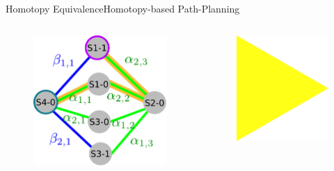 \begin{frame}{Homotopy Equivalence}{Homotopy-based Path-Planning}

\begin{columns}

\begin{figure}
	\centering
	\includegraphics[width=\linewidth]{figure/obs_topology}
\end{figure}
\begin{figure}
	\centering
	\includegraphics[width=\linewidth]{figure/arrow2}

\end{figure}
\end{columns}
\end{frame}
